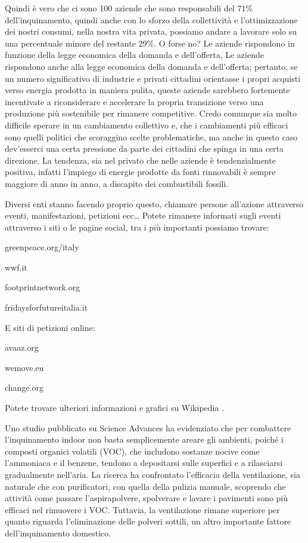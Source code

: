 \documentclass[12pt]{book} %
\begin{document}
Quindi è vero che ci sono 100 aziende che sono responsabili del 71\% dell'inquinamento, quindi
anche con lo sforzo della collettività e l'ottimizzazione dei nostri consumi, nella nostra vita
privata, possiamo andare a lavorare solo su una percentuale minore del restante 29\%. O forse no? Le aziende rispondono
in funzione della legge economica della domanda e dell'offerta, Le aziende rispondono anche alla legge economica della domanda e dell'offerta; pertanto, se un numero significativo di industrie e privati cittadini orientasse i propri acquisti verso energia prodotta in maniera pulita, queste aziende sarebbero fortemente incentivate a riconsiderare e accelerare la propria transizione verso una produzione più sostenibile per rimanere competitive. 
Credo comunque sia molto difficile sperare in un cambiamento collettivo e, che i cambiamenti più efficaci sono quelli politici che scoraggino scelte problematiche, ma anche in questo caso dev'esserci una certa pressione da parte dei cittadini che spinga in una certa direzione.
La tendenza, sia nel privato che nelle aziende è tendenzialmente positiva, infatti l'impiego di energie prodotte da fonti
rinnovabili è sempre maggiore di anno in anno, a discapito dei combustibili fossili.

Diversi enti stanno facendo proprio questo, chiamare persone all'azione attraverso eventi,
manifestazioni, petizioni ecc… Potete rimanere informati sugli eventi attraverso i siti o le pagine social, tra i più
importanti possiamo trovare:

greenpeace.org/italy

wwf.it

footprintnetwork.org

fridaysforfutureitalia.it 



E siti di petizioni online:

avaaz.org

wemove.eu

change.org


Potete trovare ulteriori informazioni e grafici su
Wikipedia
.


\begin{mdframed}[linewidth=1pt]
Uno studio pubblicato su Science Advances ha evidenziato che per combattere l’inquinamento indoor non basta semplicemente areare gli ambienti, poiché i composti organici volatili (VOC), che includono sostanze nocive come l’ammoniaca e il benzene, tendono a depositarsi sulle superfici e a rilasciarsi gradualmente nell’aria. La ricerca ha confrontato l’efficacia della ventilazione, sia naturale che con purificatori, con quella della pulizia manuale, scoprendo che attività come passare l’aspirapolvere, spolverare e lavare i pavimenti sono più efficaci nel rimuovere i VOC. Tuttavia, la ventilazione rimane superiore per quanto riguarda l’eliminazione delle polveri sottili, un altro importante fattore dell’inquinamento domestico.
\end{mdframed}
\end{document}
